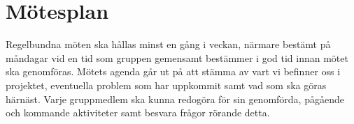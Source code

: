 \section{Mötesplan}

Regelbundna möten ska hållas minst en gång i veckan, närmare bestämt på måndagar vid en tid som gruppen gemensamt bestämmer i god tid innan mötet ska genomföras. Mötets agenda går ut på att stämma av vart vi befinner oss i projektet, eventuella problem som har uppkommit samt vad som ska göras härnäst. Varje gruppmedlem ska kunna redogöra för sin genomförda, pågående och kommande aktiviteter samt besvara frågor rörande detta. 
